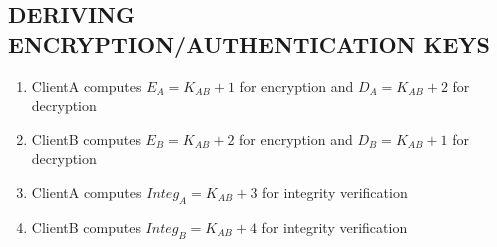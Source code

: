 \documentclass[twoside,letterpaper]{article}
\begin{document}
\bigskip
 
\subsection{DERIVING ENCRYPTION/AUTHENTICATION KEYS}

\bigskip

\begin{enumerate}
\item ClientA computes $E_{A} = K_{AB} + 1$ for encryption and $D_{A} = K_{AB} + 2$ for decryption
\item ClientB computes $E_{B} = K_{AB} + 2$ for encryption and $D_{B} = K_{AB} + 1$ for decryption
\item ClientA computes $Integ_{A} = K_{AB} + 3$ for integrity verification
\item ClientB computes $Integ_{B} = K_{AB} + 4$ for integrity verification
\end{enumerate}
\end{document}
